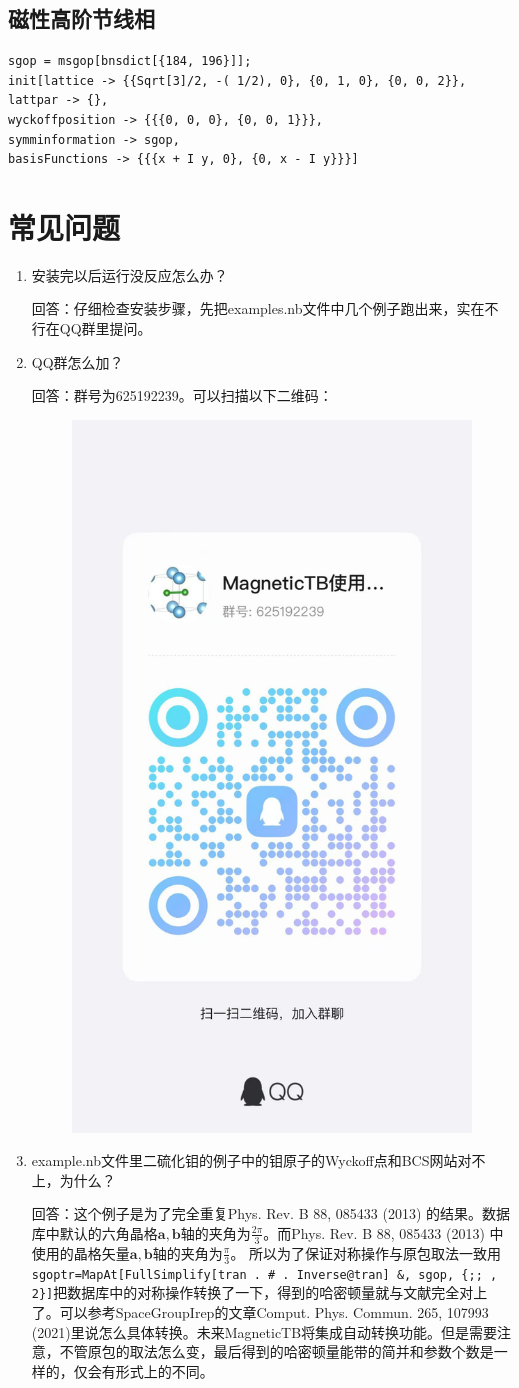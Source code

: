 \documentclass[titlepage,a4paper,12pt,AutoFakeBold]{article}
\newcommand\litem[1]{\item{ #1？\\}}
\begin{document}
\subsection{磁性高阶节线相}
\begin{lstlisting}
sgop = msgop[bnsdict[{184, 196}]];
init[lattice -> {{Sqrt[3]/2, -( 1/2), 0}, {0, 1, 0}, {0, 0, 2}},
lattpar -> {},
wyckoffposition -> {{{0, 0, 0}, {0, 0, 1}}},
symminformation -> sgop,
basisFunctions -> {{{x + I y, 0}, {0, x - I y}}}]
\end{lstlisting}
\fi

\section{常见问题}
    \begin{enumerate}[style=nextline]
    \setlength\itemsep{1.5em}
	\litem{安装完以后运行没反应怎么办} 
	
	回答：仔细检查安装步骤，先把examples.nb文件中几个例子跑出来，实在不行在QQ群里提问。
	
	\litem{QQ群怎么加} 
	
	回答：群号为625192239。可以扫描以下二维码：
	\begin{figure}[H]
		\centering
		\includegraphics[width=.3\textwidth]{./figures/QQ}
	\end{figure}
	
	\litem{example.nb文件里二硫化钼的例子中的钼原子的Wyckoff点和BCS网站对不上，为什么}
	
	回答：这个例子是为了完全重复Phys. Rev. B 88, 085433 (2013) 的结果。数据库中默认的六角晶格$\boldsymbol{a}, \boldsymbol{b}$轴的夹角为$\frac{2\pi}{3}$。而Phys. Rev. B 88, 085433 (2013) 中使用的晶格矢量$\boldsymbol{a}, \boldsymbol{b}$轴的夹角为$\frac{\pi}{3}$。 所以为了保证对称操作与原包取法一致用\lstinline|sgoptr=MapAt[FullSimplify[tran . # . Inverse@tran] &, sgop, {;; , 2}]|把数据库中的对称操作转换了一下，得到的哈密顿量就与文献完全对上了。可以参考\textsf{SpaceGroupIrep}的文章Comput. Phys. Commun. 265, 107993  (2021)里说怎么具体转换。未来\textsf{MagneticTB}将集成自动转换功能。但是需要注意，不管原包的取法怎么变，最后得到的哈密顿量能带的简并和参数个数是一样的，仅会有形式上的不同。
	

\end{enumerate}
\end{document}
